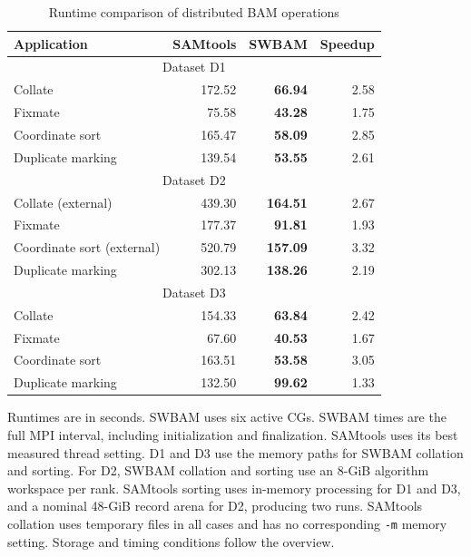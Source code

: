 \documentclass[lettersize,journal]{IEEEtran}
\begin{document}
\begin{table}[!t]
\centering
\begin{threeparttable}
\caption{Runtime comparison of distributed BAM operations}
\label{tab:distributed-bam}
\footnotesize
\setlength{\tabcolsep}{3pt}
\begin{tabular*}{\columnwidth}{@{\extracolsep{\fill}}lrrr@{}}
\toprule
Application & SAMtools & SWBAM & Speedup \\
\midrule
\multicolumn{4}{c}{Dataset D1} \\
\midrule
Collate & 172.52 & \textbf{66.94} & 2.58 \\
Fixmate & 75.58 & \textbf{43.28} & 1.75 \\
Coordinate sort & 165.47 & \textbf{58.09} & 2.85 \\
Duplicate marking & 139.54 & \textbf{53.55} & 2.61 \\
\midrule
\multicolumn{4}{c}{Dataset D2} \\
\midrule
Collate (external) & 439.30 & \textbf{164.51} & 2.67 \\
Fixmate & 177.37 & \textbf{91.81} & 1.93 \\
Coordinate sort (external) & 520.79 & \textbf{157.09} & 3.32 \\
Duplicate marking & 302.13 & \textbf{138.26} & 2.19 \\
\midrule
\multicolumn{4}{c}{Dataset D3} \\
\midrule
Collate & 154.33 & \textbf{63.84} & 2.42 \\
Fixmate & 67.60 & \textbf{40.53} & 1.67 \\
Coordinate sort & 163.51 & \textbf{53.58} & 3.05 \\
Duplicate marking & 132.50 & \textbf{99.62} & 1.33 \\
\bottomrule
\end{tabular*}
\begin{tablenotes}[flushleft]
\scriptsize
\item Runtimes are in seconds.
SWBAM uses six active CGs.
SWBAM times are the full MPI interval, including initialization and finalization.
SAMtools uses its best measured thread setting.
D1 and D3 use the memory paths for SWBAM collation and sorting.
For D2, SWBAM collation and sorting use an 8-GiB algorithm workspace per rank.
SAMtools sorting uses in-memory processing for D1 and D3, and a nominal 48-GiB record arena for D2, producing two runs.
SAMtools collation uses temporary files in all cases and has no corresponding \texttt{-m} memory setting.
Storage and timing conditions follow the overview.
\end{tablenotes}
\end{threeparttable}
\end{table}
\end{document}
